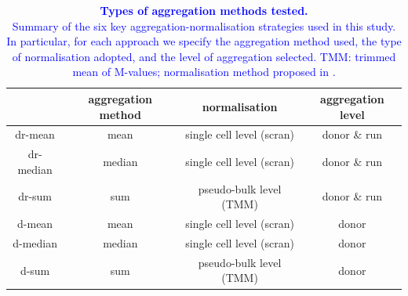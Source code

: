 \begin{table}[h]
    \centering
    \begin{tabular}{c|c c c}
    &       aggregation method & normalisation & aggregation level  \\
    \hline
    dr-mean    & mean   & single cell level (scran) &  donor \& run \\
    dr-median  & median & single cell level (scran) &  donor \& run \\
    dr-sum     & sum    & pseudo-bulk level (TMM) &  donor \& run \\
    d-mean     & mean   & single cell level (scran) &  donor \\
    d-median   & median & single cell level (scran) &  donor \\
    d-sum      & sum    & pseudo-bulk level (TMM) &  donor \\
    \end{tabular}
    \caption[Aggregation methods used]{\textcolor{blue}{\textbf{Types of aggregation methods tested.}\\
    Summary of the six key aggregation-normalisation strategies used in this study. 
    In particular, for each approach we specify the aggregation method used, the type of normalisation adopted, and the level of aggregation selected.
    TMM: trimmed mean of M-values; normalisation method proposed in \cite{robinson2010scaling}.}}
    \label{tab:sc_eqtl_aggregations}
\end{table}





